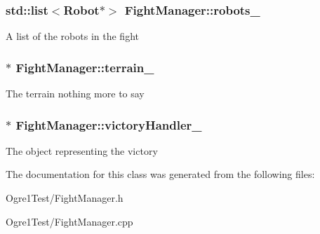 \subsubsection[{\texorpdfstring{robots\+\_\+}{robots_}}]{\setlength{\rightskip}{0pt plus 5cm}std\+::list$<${\bf Robot}$\ast$$>$ Fight\+Manager\+::robots\+\_\+\hspace{0.3cm}{\ttfamily [protected]}}\hypertarget{class_fight_manager_afb1ab0e038832ad09f96479d05eae33a}{}\label{class_fight_manager_afb1ab0e038832ad09f96479d05eae33a}
A list of the robots in the fight 
\subsubsection[{\texorpdfstring{terrain\+\_\+}{terrain_}}]{$\ast$ Fight\+Manager\+::terrain\+\_\+\hspace{0.3cm}{\ttfamily [protected]}}\hypertarget{class_fight_manager_a9bf673e56ca054a1367754e4a372798d}{}\label{class_fight_manager_a9bf673e56ca054a1367754e4a372798d}
The terrain nothing more to say 
\subsubsection[{\texorpdfstring{victory\+Handler\+\_\+}{victoryHandler_}}]{$\ast$ Fight\+Manager\+::victory\+Handler\+\_\+\hspace{0.3cm}{\ttfamily [protected]}}\hypertarget{class_fight_manager_a416376c948af3f11a4fe144ca994599a}{}\label{class_fight_manager_a416376c948af3f11a4fe144ca994599a}
The object representing the victory 

The documentation for this class was generated from the following files\+:\begin{DoxyCompactItemize}
\item 
Ogre1\+Test/Fight\+Manager.\+h\item 
Ogre1\+Test/Fight\+Manager.\+cpp\end{DoxyCompactItemize}
